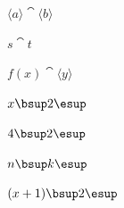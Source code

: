 \documentclass[a4paper,10pt,fleqn]{article}
\begin{document}
\noindent
$\langle a \rangle \cat \langle b \rangle$


\noindent
$s \cat t$


\noindent
$f(x) \cat \langle y \rangle$


\noindent
$x \bsup 2 \esup$


\noindent
$4 \bsup 2 \esup$


\noindent
$n \bsup k \esup$


\noindent
$(x + 1) \bsup 2 \esup$
\end{document}

